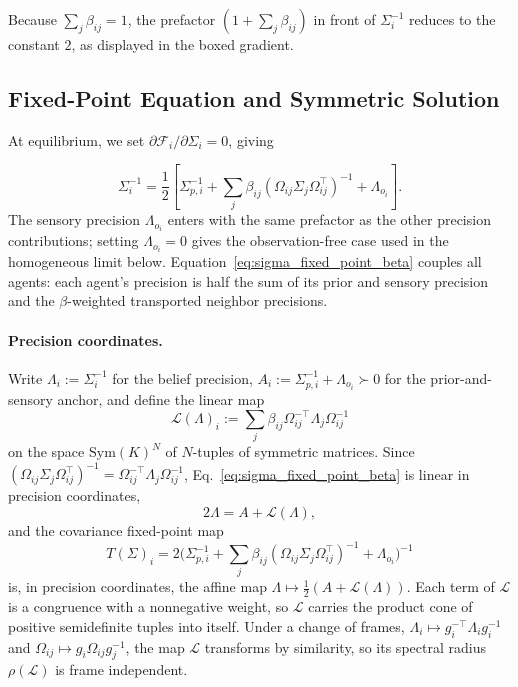Because $\sum_j \beta_{ij} = 1$, the prefactor $(1 + \sum_j \beta_{ij})$ in front of $\Sigma_i^{-1}$ reduces to the constant $2$, as displayed in the boxed gradient.

\subsection{Fixed-Point Equation and Symmetric Solution}

At equilibrium, we set $\partial \mathcal{F}_i / \partial \Sigma_i = 0$, giving

\begin{equation}
\Sigma_i^{-1}
=\frac{1}{2}
\left[
\Sigma_{p,i}^{-1}
+ \sum_j \beta_{ij}
(\Omega_{ij}\Sigma_j\Omega_{ij}^\top)^{-1}
+ \Lambda_{o_i}
\right].
\label{eq:sigma_fixed_point_beta}
\end{equation}
The sensory precision $\Lambda_{o_i}$ enters with the same prefactor as the other precision contributions; setting $\Lambda_{o_i} = 0$ gives the observation-free case used in the homogeneous limit below. Equation~\eqref{eq:sigma_fixed_point_beta} couples all agents: each agent's precision is half the sum of its prior and sensory precision and the $\beta$-weighted transported neighbor precisions.

\paragraph{Precision coordinates.} Write $\Lambda_i := \Sigma_i^{-1}$ for the belief precision, $A_i := \Sigma_{p,i}^{-1} + \Lambda_{o_i} \succ 0$ for the prior-and-sensory anchor, and define the linear map
\begin{equation}
\mathcal{L}(\Lambda)_i := \sum_j \beta_{ij}\Omega_{ij}^{-\top}\Lambda_j\Omega_{ij}^{-1}
\label{eq:precision_transport_map}
\end{equation}
on the space $\mathrm{Sym}(K)^N$ of $N$-tuples of symmetric matrices. Since $(\Omega_{ij}\Sigma_j\Omega_{ij}^\top)^{-1} = \Omega_{ij}^{-\top}\Lambda_j\Omega_{ij}^{-1}$, Eq.~\eqref{eq:sigma_fixed_point_beta} is linear in precision coordinates,
\begin{equation}
2\Lambda = A + \mathcal{L}(\Lambda),
\label{eq:precision_linear}
\end{equation}
and the covariance fixed-point map
\begin{equation}
T(\Sigma)_i = 2\big(\Sigma_{p,i}^{-1} + \sum_j \beta_{ij}(\Omega_{ij}\Sigma_j\Omega_{ij}^\top)^{-1} + \Lambda_{o_i}\big)^{-1}
\label{eq:sigma_fixed_point_map}
\end{equation}
is, in precision coordinates, the affine map $\Lambda \mapsto \tfrac{1}{2}(A + \mathcal{L}(\Lambda))$. Each term of $\mathcal{L}$ is a congruence with a nonnegative weight, so $\mathcal{L}$ carries the product cone of positive semidefinite tuples into itself. Under a change of frames, $\Lambda_i \mapsto g_i^{-\top}\Lambda_i g_i^{-1}$ and $\Omega_{ij} \mapsto g_i\Omega_{ij}g_j^{-1}$, the map $\mathcal{L}$ transforms by similarity, so its spectral radius $\rho(\mathcal{L})$ is frame independent.

